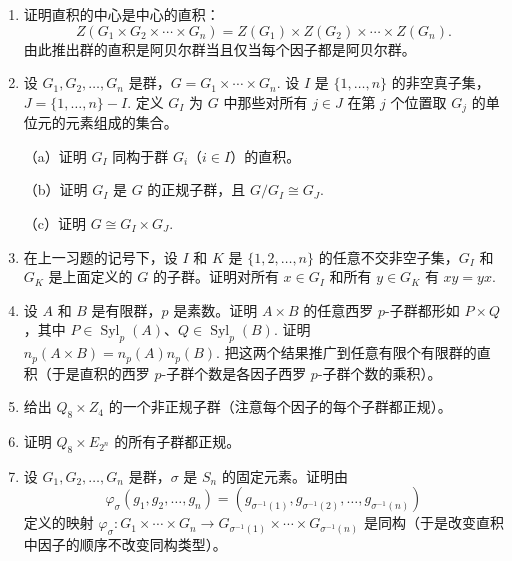 \begin{enumerate}
\item 证明直积的中心是中心的直积：
\[
Z(G_1 \times G_2 \times \cdots \times G_n) = Z(G_1) \times Z(G_2) \times \cdots \times Z(G_n).
\]
由此推出群的直积是阿贝尔群当且仅当每个因子都是阿贝尔群。

\item 设 \(G_1, G_2, \ldots, G_n\) 是群，\(G = G_1 \times \cdots \times G_n\). 设 \(I\) 是 \(\{1, \ldots, n\}\) 的非空真子集，\(J = \{1, \ldots, n\} - I\). 定义 \(G_I\) 为 \(G\) 中那些对所有 \(j \in J\) 在第 \(j\) 个位置取 \(G_j\) 的单位元的元素组成的集合。

（a）证明 \(G_I\) 同构于群 \(G_i\)（\(i \in I\)）的直积。

（b）证明 \(G_I\) 是 \(G\) 的正规子群，且 \(G/G_I \cong G_J\).

（c）证明 \(G \cong G_I \times G_J\).

\item 在上一习题的记号下，设 \(I\) 和 \(K\) 是 \(\{1, 2, \ldots, n\}\) 的任意不交非空子集，\(G_I\) 和 \(G_K\) 是上面定义的 \(G\) 的子群。证明对所有 \(x \in G_I\) 和所有 \(y \in G_K\) 有 \(xy = yx\).

\item 设 \(A\) 和 \(B\) 是有限群，\(p\) 是素数。证明 \(A \times B\) 的任意西罗 \(p\)-子群都形如 \(P \times Q\)，其中 \(P \in \operatorname{Syl}_p(A)\)、\(Q \in \operatorname{Syl}_p(B)\). 证明 \(n_p(A \times B) = n_p(A)n_p(B)\). 把这两个结果推广到任意有限个有限群的直积（于是直积的西罗 \(p\)-子群个数是各因子西罗 \(p\)-子群个数的乘积）。

\item 给出 \(Q_8 \times Z_4\) 的一个非正规子群（注意每个因子的每个子群都正规）。

\item 证明 \(Q_8 \times E_{2^n}\) 的所有子群都正规。

\item 设 \(G_1, G_2, \ldots, G_n\) 是群，\(\sigma\) 是 \(S_n\) 的固定元素。证明由
\[
\varphi_\sigma(g_1, g_2, \ldots, g_n) = (g_{\sigma^{-1}(1)}, g_{\sigma^{-1}(2)}, \ldots, g_{\sigma^{-1}(n)})
\]
定义的映射 \(\varphi_\sigma : G_1 \times \cdots \times G_n \to G_{\sigma^{-1}(1)} \times \cdots \times G_{\sigma^{-1}(n)}\) 是同构（于是改变直积中因子的顺序不改变同构类型）。


\end{enumerate}
